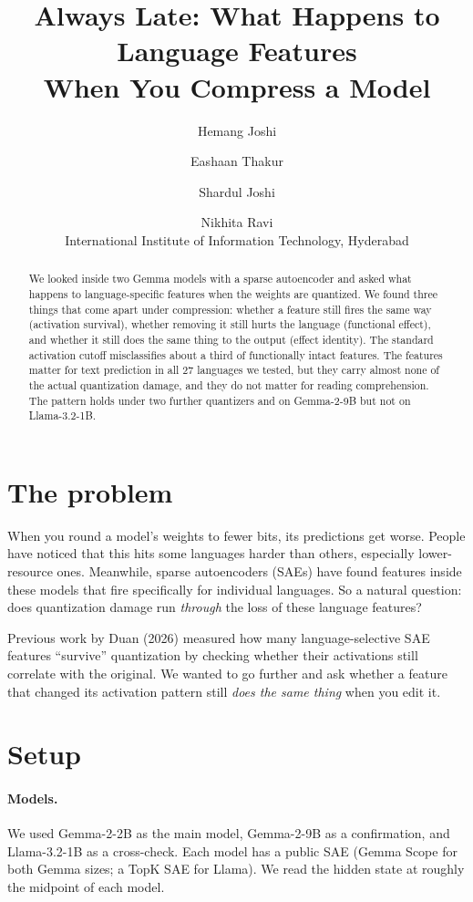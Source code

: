 \documentclass[11pt]{article}
\title{Always Late: What Happens to Language Features\\When You Compress a Model}
\author{Hemang Joshi \and Eashaan Thakur \and Shardul Joshi \and Nikhita Ravi\\
International Institute of Information Technology, Hyderabad}
\begin{document}
\maketitle

\begin{abstract}
We looked inside two Gemma models with a sparse autoencoder and asked what happens to language-specific features when the weights are quantized. We found three things that come apart under compression: whether a feature still fires the same way (activation survival), whether removing it still hurts the language (functional effect), and whether it still does the same thing to the output (effect identity). The standard activation cutoff misclassifies about a third of functionally intact features. The features matter for text prediction in all 27 languages we tested, but they carry almost none of the actual quantization damage, and they do not matter for reading comprehension. The pattern holds under two further quantizers and on Gemma-2-9B but not on Llama-3.2-1B.
\end{abstract}

\section{The problem}

When you round a model's weights to fewer bits, its predictions get worse. People have noticed that this hits some languages harder than others, especially lower-resource ones. Meanwhile, sparse autoencoders (SAEs) have found features inside these models that fire specifically for individual languages. So a natural question: does quantization damage run \textit{through} the loss of these language features?

Previous work by Duan (2026) measured how many language-selective SAE features ``survive'' quantization by checking whether their activations still correlate with the original. We wanted to go further and ask whether a feature that changed its activation pattern still \textit{does the same thing} when you edit it.

\section{Setup}

\paragraph{Models.} We used Gemma-2-2B as the main model, Gemma-2-9B as a confirmation, and Llama-3.2-1B as a cross-check. Each model has a public SAE (Gemma Scope for both Gemma sizes; a TopK SAE for Llama). We read the hidden state at roughly the midpoint of each model.
\end{document}
